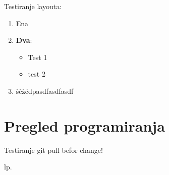 
Testiranje layouta:

\begin{enumerate}
\item Ena
\item \textbf{Dva}:
  \begin{itemize}[style]
  \item Test 1
  \item test 2
  \end{itemize}
\item ščžćđpasdfasdfasdf
\end{enumerate}

\chapter{Pregled programiranja}
\label{chap:Pregled_programiranja}

Testiranje git pull befor change!

lp.



